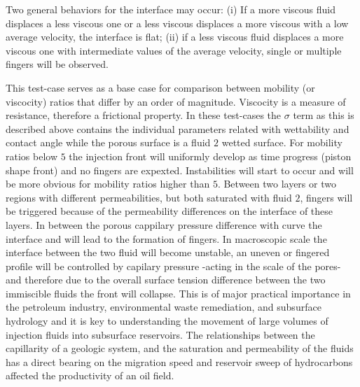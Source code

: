 \documentclass[preprint,authoryear,12pt]{elsarticle}
\begin{document}
Two general behaviors for the interface may occur: (i) If a more viscous fluid displaces a less viscous one or a less viscous displaces a more viscous with a low average velocity, the interface is flat; (ii) if a less viscous fluid displaces a more viscous one with intermediate values of the average velocity, single or multiple fingers will be observed.

This test-case serves as a base case for comparison between mobility (or viscocity) ratios that differ by an order of magnitude. Viscocity is a measure of resistance, therefore a frictional property. In these test-cases the $\sigma$ term as this is described above contains the individual parameters related with wettability and contact angle while the porous surface is a fluid $2$ wetted surface. For mobility ratios below $5$ the injection front will uniformly develop as time progress (piston shape front) and no fingers are expexted. Instabilities will start to occur and will be more obvious for mobility ratios higher than $5$. Between two layers or two regions with different permeabilities, but both saturated with fluid $2$, fingers will be triggered because of the permeability differences on the interface of these layers. In between the porous cappilary pressure difference with curve the interface and will lead to the formation of fingers. In macroscopic scale the interface between the two fluid will become unstable, an uneven or fingered profile will be controlled by capilary pressure -acting in the scale of the pores- and therefore due to the overall surface tension difference between the two immiscible fluids the front will collapse. This is of major practical importance in the petroleum industry, environmental waste remediation, and subsurface hydrology and it is key to understanding the movement of large volumes of injection fluids into subsurface reservoirs. The relationships between the capillarity of a geologic system, and the saturation and permeability of the fluids has a direct bearing on the migration speed and reservoir sweep of hydrocarbons affected the productivity of an oil field.
\end{document}
